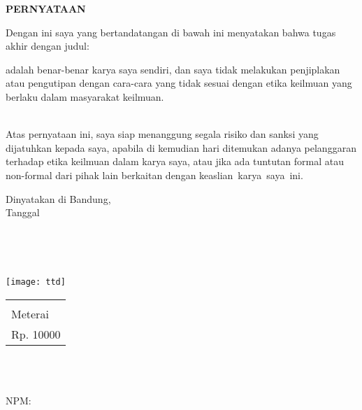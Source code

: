 \documentclass[11pt,a4paper,twoside,openright,notitlepage]{report}
\newcommand{\rtext}[1]{{\color{red} \small #1}}%
\newcommand{\vstaINA}{\rtext{TUGAS AKHIR}}
\begin{document}
{{{	%
	\vspace*{4cm}
	\begin{center} 
		{\Large \textbf{PERNYATAAN}\\} \vspace{1cm}
	\end{center}
	{\noindent Dengan ini saya yang bertandatangan di bawah ini menyatakan bahwa \MakeLowercase{\vstaINA} dengan judul:  \vspace{0.5cm}
	\begin{center} {\large \textbf{\vjudulINA}}\end{center}
	\vspace{0.5cm}
	adalah benar-benar karya saya sendiri, dan saya tidak melakukan penjiplakan atau pengutipan dengan cara-cara yang tidak sesuai dengan etika keilmuan yang berlaku dalam masyarakat keilmuan.}
	\vspace{0pt}\\
	{\noindent			
	Atas pernyataan ini, saya siap menanggung segala risiko dan sanksi yang dijatuhkan kepada saya, apabila di kemudian hari ditemukan adanya pelanggaran terhadap etika keilmuan dalam karya saya, atau jika ada tuntutan formal atau non-formal dari pihak lain berkaitan dengan keaslian~karya~saya~ini.\\}
	\vspace{0.25cm}
	
	\begin{flushright}	
		Dinyatakan di Bandung,\\
		Tanggal \vtanggal\ \vbulan\ \vtahun \\
		    {\begin{Form} \ \digsigfield{5cm}{2.25cm}{\vnama}\ \end{Form}\\}
		    {
		        {\texttt{[image: ttd]}\\}
		        {{
		            {\vspace{0.5cm}
        		    \begin{tabular}{|p{1.75cm}|}\hline\\Meterai\\Rp. 10000\\ \hline\end{tabular}\\\vspace{0.5cm}}
        		    {\vspace{2.5cm}}
		        }
		        }    
        	}
		\vnama \\
		NPM: \vnpm
	\end{flushright}
	 \cleardoublepage 

}}}
\end{document}
